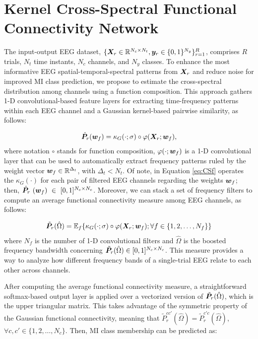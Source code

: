 \section{Kernel Cross-Spectral Functional Connectivity Network}\label{sec:gcnet}
	
	The input-output EEG dataset, $\{\bm {X}_r \in \mathbb{R}^{N_c \times N_t}, \bm {y}_r \in\{0,1\}^{N_y}\}^R_{r=1}$, comprises $R$ trials, $N_t$ time instants, $N_c$ channels, and $N_y$ classes. To enhance the most informative EEG spatial-temporal-spectral patterns from $\bm {X}_r$ and reduce noise for improved MI class prediction, we propose to estimate the cross-spectral distribution among channels using a function composition. This approach gathers 1-D convolutional-based feature layers for extracting time-frequency patterns within each EEG channel and a Gaussian kernel-based pairwise similarity, as follows:
	
	\begin{equation}\label{eq:CSf}
		\hat{\bm {P}}_{r}(\bm {w}_f)  = {\kappa_G}(\cdot;\sigma) \circ \varphi(\bm {X}_r; \bm {w}_f), 
	\end{equation}
	where notation $\circ$ stands for function composition, $\varphi(\cdot; \bm {w}_f)$ is a 1-D convolutional layer that can be used to automatically extract frequency patterns ruled by the weight vector $\bm {w}_f\in \mathbb{R}^{\Delta_t}$, with $\Delta_t<N_t.$ Of note, in Equation \eqref{eq:CSf} operates the $\kappa_G(\cdot)$ for each pair of filtered EEG channels regarding the weights $\bm {w}_f$; then,  $\hat{\bm {P}}_{r}~(\bm {w}_f)~\in~[0,1]^{N_c\times N_c}$. Moreover, we can stack a set of frequency filters to compute an average functional connectivity measure among EEG channels, as follows: 
	
	\begin{equation}
		\tilde{\bm {P}}_r(\hat{\Omega})  = \mathbb{E}_{f}\!\left\{ \kappa_{G}(\cdot;\sigma) \circ \varphi(\bm {X}_r ; \bm {w}_f ); \forall f \in \{1,2,\dots,N_f \} \right\} 
	\end{equation}
	where $N_f$ is the number of 1-D convolutional filters and $\hat{\Omega}$ is the boosted frequency bandwidth concerning $\tilde{\bm {P}}_r(\hat{\Omega})\in[0,1]^{N_c \times N_c}$. This measure provides a way to analyze how different frequency bands of a single-trial EEG relate to each other across channels.
	
	After computing the average functional connectivity measure, a straightforward softmax-based output layer is applied over a vectorized version of $\tilde{\bm {P}}_r(\hat{\Omega})$, which is the upper triangular matrix. This takes advantage of the symmetric property of the Gaussian functional connectivity, meaning that $\tilde{{P}}^{cc'}_r(\hat{\Omega})=\tilde{{P}}^{c'c}_r(\hat{\Omega})$, $\forall c,c'\in\{1,2,\dots,N_c\}$. Then, MI class membership can be predicted as:
	
